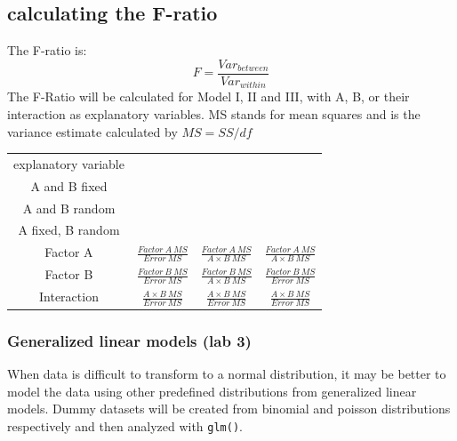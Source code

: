 \documentclass{article}
\begin{document}
\subsection{calculating the F-ratio}
The F-ratio is: $$F = \frac{Var_{between}}{Var_{within}}$$
The F-Ratio will be calculated for Model I, II and III, with A, B, or their interaction as explanatory variables. MS stands for mean squares and is the variance estimate calculated by $MS = SS/df$
\begin{table}[h]
    \centering
    \begin{tabular}{c|c|c|c}
         explanatory variable & \thead{\textbf{Model I:} \\A and B fixed} & \thead{\textbf{Model II:}\\ A and B random} & \thead{\textbf{Model III:}\\ A fixed, B random} \\
         \hline
         Factor A & $\frac{Factor \: A \: MS}{Error \: MS}$ & $\frac{Factor \: A \: MS}{A \times B \: MS}$ & $\frac{Factor \: A \: MS}{A \times B \: MS}$ \\
         \hline
         Factor B & $\frac{Factor \: B \: MS}{Error \: MS}$ & $\frac{Factor \: B \: MS}{A \times B \: MS}$ & $\frac{Factor \: B \: MS}{Error \: MS}$ \\
         \hline
         Interaction & $\frac{A \times B \: MS}{Error \: MS}$ & $\frac{A \times B \: MS}{Error \: MS}$ & $\frac{A \times B \: MS}{Error \: MS}$ \\
    \end{tabular}
\end{table}
\renewcommand{\arraystretch}{1}

\subsubsection{Generalized linear models (lab 3)}
When data is difficult to transform to a normal distribution, it may be better to model the data using other predefined distributions from generalized linear models. Dummy datasets will be created from binomial and poisson distributions respectively and then analyzed with \texttt{glm()}.
\end{document}
